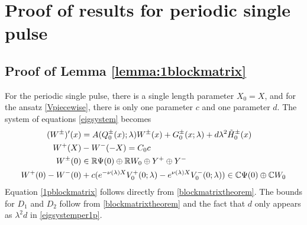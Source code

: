 \documentclass[10pt,reqno]{amsart}
\theoremstyle{plain}
\theoremstyle{definition}
\theoremstyle{remark}
\numberwithin{theorem}{section}
\numberwithin{equation}{section}
\begin{document}
\section{Proof of results for periodic single pulse }\label{sec:singlepulse}

\subsection{Proof of Lemma \ref{lemma:1blockmatrix} }

For the periodic single pulse, there is a single length parameter $X_0 = X$, and for the ansatz \cref{Vpiecewise}, there is only one parameter $c$ and one parameter $d$. The system of equations \cref{eigsystem} becomes
\begin{equation}\label{eigsystemper1p}
\begin{aligned}
(W^\pm)'(x) &= A(Q_0^\pm(x); \lambda) W^\pm(x) + G_0^\pm(x; \lambda) + d \lambda^2 \tilde{H}_0^\pm(x)  \\
W^+(X) &- W^-(-X) = C_0 c \\
W^\pm(0) &\in \mathbb{R} \Psi(0) \oplus \mathbb{R} W_0 \oplus Y^+ \oplus Y^- \\
W^+(0) - W^-(0) &+ c ( e^{-\nu(\lambda)X}V_0^+(0; \lambda) - e^{\nu(\lambda)X} V_0^-(0; \lambda)) \in \mathbb{C} \Psi(0) \oplus \mathbb{C} W_0\end{aligned}
\end{equation}
Equation \cref{1pblockmatrix} follows directly from \cref{blockmatrixtheorem}. The bounds for $D_1$ and $D_2$ follow from \cref{blockmatrixtheorem} and the fact that $d$ only appears as $\lambda^2 d$ in \cref{eigsystemper1p}. 
\end{document}
